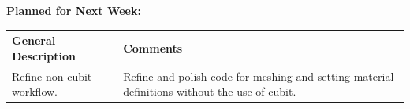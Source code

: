 \documentclass{article}
\begin{document}
\textbf{Planned for Next Week: }

\renewcommand{\arraystretch}{1.5}
\begin{table}[H]
    \centering
    \begin{tabularx}{0.95\textwidth} { 
        | >{\centering\arraybackslash}X
        | >{\centering\arraybackslash}X | }

    \hline
    \textbf{General Description} & \textbf{Comments} \\
    \hline
    Refine non-cubit workflow. & Refine and polish code for meshing and setting material definitions without the use of cubit. \\
    \hline
    \end{tabularx}
\end{table}
\end{document}
